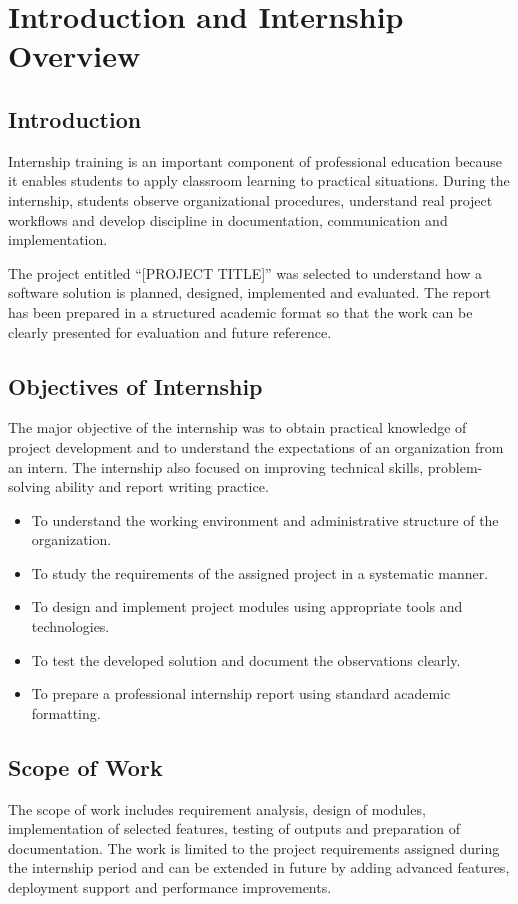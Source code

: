 \documentclass[12pt,a4paper]{report}
\newcommand{\chapterheader}{CHAPTER HEADING}
\begin{document}
\setcounter{page}{1}
\renewcommand{\chapterheader}{CHAPTER 1}
\chapter{Introduction and Internship Overview}
\section{Introduction}
Internship training is an important component of professional education because it enables students to apply classroom learning to practical situations. During the internship, students observe organizational procedures, understand real project workflows and develop discipline in documentation, communication and implementation.

The project entitled ``[PROJECT TITLE]'' was selected to understand how a software solution is planned, designed, implemented and evaluated. The report has been prepared in a structured academic format so that the work can be clearly presented for evaluation and future reference.

\section{Objectives of Internship}
The major objective of the internship was to obtain practical knowledge of project development and to understand the expectations of an organization from an intern. The internship also focused on improving technical skills, problem-solving ability and report writing practice.

\begin{itemize}[leftmargin=0.35in,itemsep=0pt,parsep=0pt]
\item To understand the working environment and administrative structure of the organization.
\item To study the requirements of the assigned project in a systematic manner.
\item To design and implement project modules using appropriate tools and technologies.
\item To test the developed solution and document the observations clearly.
\item To prepare a professional internship report using standard academic formatting.
\end{itemize}

\section{Scope of Work}
The scope of work includes requirement analysis, design of modules, implementation of selected features, testing of outputs and preparation of documentation. The work is limited to the project requirements assigned during the internship period and can be extended in future by adding advanced features, deployment support and performance improvements.
\end{document}
